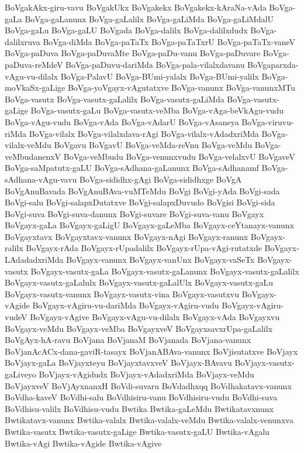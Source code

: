 {BoVgakAkx-giru-vavu
BoVgakUkx
BoVgakekx
BoVgakekx-kAraNa-vAda
BoVga-gaLa
BoVga-gaLanunx
BoVga-gaLalilx
BoVga-gaLiMda
BoVga-gaLiMdalU
BoVga-gaLu
BoVga-gaLU
BoVgada
BoVga-dalilx
BoVga-dalilxdudx
BoVga-dalilxruva
BoVga-diMda
BoVga-paTaTx
BoVga-paTaTxrU
BoVga-paTaTx-vaneV
BoVga-paDuva
BoVga-paDuvaMte
BoVga-paDu-vanu
BoVga-paDuvare
BoVga-paDuva-reMdeV
BoVga-paDuvu-dariMda
BoVga-pala-vilalxdavanu
BoVgaparxda-vAgu-vu-dilalx
BoVga-PalavU
BoVga-BUmi-yalalx
BoVga-BUmi-yalilx
BoVga-moVkaSx-gaLige
BoVga-yoVgayx-vAgutatxve
BoVga-vanunx
BoVga-vanunxMTu
BoVga-vasutx
BoVga-vasutx-gaLalilx
BoVga-vasutx-gaLiMda
BoVga-vasutx-gaLige
BoVga-vasutx-gaLu
BoVga-vasutx-veMba
BoVga-vAga-beVkAgu-vudu
BoVga-vAgu-vudu
BoVga-vAda
BoVga-vAdarU
BoVga-vAsaneya
BoVga-viruvu-riMda
BoVga-vilalx
BoVga-vilalxdava-rAgi
BoVga-vilalx-vAdadxriMda
BoVga-vilalx-veMdu
BoVgavu
BoVgavU
BoVga-veMda-reVnu
BoVga-veMdu
BoVga-veMbudanenxV
BoVga-veMbudu
BoVga-venunxvudu
BoVga-velalxvU
BoVgaveV
BoVga-saMpatutx-gaLU
BoVga-sAdhana-gaLanunx
BoVga-sAdhanamf
BoVga-sAdhana-vAgu-vavu
BoVga-sididhx-gAgi
BoVga-sididhxge
BoVgA
BoVgAnuBavada
BoVgAnuBAva-vuMTeMdu
BoVgi
BoVgi-yAda
BoVgi-sada
BoVgi-salu
BoVgi-salapxDutatxve
BoVgi-salapxDuvudo
BoVgisi
BoVgi-sida
BoVgi-suva
BoVgi-suva-danunx
BoVgi-suvare
BoVgi-suva-vanu
BoVgayx
BoVgayx-gaLa
BoVgayx-gaLigU
BoVgayx-gaLeMba
BoVgayx-ceYtanayx-vanunx
BoVgayxtavx
BoVgayxtavx-vanunx
BoVgayx-nAgi
BoVgayx-ranunx
BoVgayx-ralilx
BoVgayx-rAda
BoVgayx-rUpadalilx
BoVgayx-rUpa-vAgi-rutatxde
BoVgayx-LAdadadxriMda
BoVgayx-vanunx
BoVgayx-vanUnx
BoVgayx-vaSeTx
BoVgayx-vasutx
BoVgayx-vasutx-gaLa
BoVgayx-vasutx-gaLanunx
BoVgayx-vasutx-gaLalilx
BoVgayx-vasutx-gaLalulx
BoVgayx-vasutx-gaLalUlx
BoVgayx-vasutx-gaLu
BoVgayx-vasutx-vanunx
BoVgayx-vasutx-vina
BoVgayx-vasutxvu
BoVgayx-vAgide
BoVgayx-vAgiru-vu-dariMda
BoVgayx-vAgiru-vudu
BoVgayx-vAgiru-vudeV
BoVgayx-vAgive
BoVgayx-vAgu-vu-dilalx
BoVgayx-vAda
BoVgayxvu
BoVgayx-veMdu
BoVgayx-veMba
BoVgayxveV
BoVgayxsavxrUpa-gaLalilx
BoVgAyx-hA-ravu
BoVjana
BoVjanaM
BoVjanada
BoVjana-vanunx
BoVjanAcACx-dana-gaviR-tasayx
BoVjanABAva-vanunx
BoVjisutatxve
BoVjayx
BoVjayx-gaLa
BoVjayxteyu
BoVjayxtavxveV
BoVjayx-BAvavu
BoVjayx-vasutx-gaLiveyo
BoVjayx-vAgidudx
BoVjayx-vAdadxriMda
BoVjayx-veMdu
BoVjayxveV
BoVjAyxnanxH
BoVdi-suvaru
BoVdadhxqq
BoVdhakatavx-vanunx
BoVdha-kaveV
BoVdhi-salu
BoVdhisiru-vanu
BoVdhisiru-vudu
BoVdhi-suva
BoVdhisu-valilx
BoVdhisu-vudu
Bwtika
Bwtika-gaLeMdu
Bwtikatavxnunx
Bwtikatavx-vanunx
Bwtika-valalx
Bwtika-valalx-veMdu
Bwtika-valalx-venunxva
Bwtika-vasutx
Bwtika-vasutx-gaLige
Bwtika-vasutx-gaLU
Bwtika-vAgalu
Bwtika-vAgi
Bwtika-vAgide
Bwtika-vAgive
}
